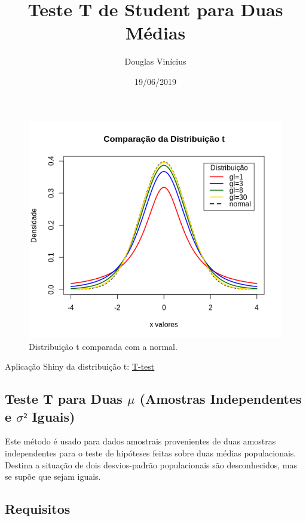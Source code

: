 \documentclass[]{article}
\title{Teste T de Student para Duas Médias}
\author{Douglas Vinícius}
\date{19/06/2019}
\begin{document}
\maketitle

\begin{figure}
\centering
\includegraphics{img/Rplot1.png}
\caption{Distribuição t comparada com a normal.}
\end{figure}

Aplicação Shiny da distribuição t:
\href{https://douglas-vincius.shinyapps.io/T-test-shiny/}{T-test}

\hypertarget{teste-t-para-duas-mu-amostras-independentes-e-sigma-iguais}{%
\subsection{\texorpdfstring{Teste T para Duas \(\mu\) (Amostras
Independentes e \(\sigma²\)
Iguais)}{Teste T para Duas \textbackslash{}mu (Amostras Independentes e \textbackslash{}sigma² Iguais)}}\label{teste-t-para-duas-mu-amostras-independentes-e-sigma-iguais}}

Este método é usado para dados amostrais provenientes de duas amostras
independentes para o teste de hipóteses feitas sobre duas médias
populacionais. Destina a situação de dois desvios-padrão populacionais
são desconhecidos, mas se supõe que sejam iguais.

\hypertarget{requisitos}{%
\subsection{Requisitos}\label{requisitos}}
\end{document}
